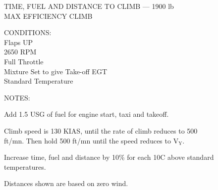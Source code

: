 \begin{figure}[t]
\begin{center}
\begin{perfhdr}TIME, FUEL AND DISTANCE TO CLIMB --- 1900 lb\\
MAX EFFICIENCY CLIMB\\
\end{perfhdr}
\Large

\normalsize
\vspace{5ex}
    \raggedright 
    CONDITIONS:\\
    Flaps UP\\
    2650 RPM\\
    Full Throttle\\
    Mixture Set to give Take-off EGT\\
    Standard Temperature\\
\hfill

\vspace{\perfnoteskip}
    \raggedright NOTES:
    \begin{enumerate*}
      \item Add 1.5 USG of fuel for engine start, taxi and takeoff.
      \item Climb speed is 130 KIAS, until the rate of climb reduces to 500 ft/mn.  Then hold 500 ft/mn until the speed reduces to $\mathrm{V_{Y}}$.
      \item Increase time, fuel and distance by 10\% for each 10\textdegree C above standard temperatures.
      \item Distances shown are based on zero wind.
      \end{enumerate*}
\vspace{\perfnoteskip}
\settowidth{\colOne}{WEIGHT}
\settowidth{\colTwo}{PRESSURE}
\settowidth{\colThree}{TEMP}
\settowidth{\colFour}{CLIMB}
\settowidth{\colFive}{RATE OF}
\settowidth{\colSix}{TIME}
\settowidth{\colSeven}{USED}
\settowidth{\colEight}{DIST.}


\end{center}
\end{figure}
